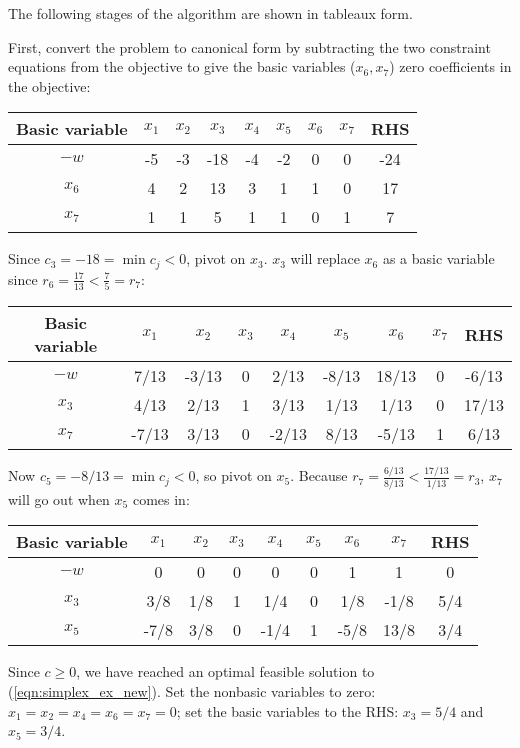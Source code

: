 The following stages of the algorithm are shown in tableaux form.

First, convert the problem to canonical form by subtracting the two constraint equations from the objective to give the basic variables ($x_6,x_7$) zero coefficients in the objective:
\begin{center}
\begin{tabular}{|c|c|c|c|c|c|c|c|c|}
\hline
Basic variable &$x_1$ &$x_2$ &$x_3$ &$x_4$ &$x_5$ &$x_6$ &$x_7$ &RHS \\
\hline
$-w$	&-5	&-3	&-18 &-4 &-2 &0 &0 &-24 \\
$x_6$	&4 &2 &13 &3 &1 &1 &0 &17 \\
$x_7$ &1 &1 &5 &1 &1 &0 &1 &7 \\
\hline
\end{tabular}
\end{center}

Since $c_3 = -18 = \min c_j < 0$, pivot on $x_3$. $x_3$ will replace $x_6$ as a basic variable since $r_6 = \frac{17}{13} < \frac{7}{5} = r_7$:
\begin{center}
\begin{tabular}{|c|c|c|c|c|c|c|c|c|}
\hline
Basic variable &$x_1$ &$x_2$ &$x_3$ &$x_4$ &$x_5$ &$x_6$ &$x_7$ &RHS \\
\hline
$-w$	&7/13 &-3/13 &0 &2/13 &-8/13 &18/13 &0 &-6/13 \\
$x_3$	&4/13 &2/13 &1 &3/13 &1/13 &1/13 &0 &17/13 \\
$x_7$ &-7/13 &3/13 &0 &-2/13 &8/13 &-5/13 &1 &6/13 \\
\hline
\end{tabular}
\end{center}

Now $c_5 = -8/13 = \min c_j < 0$, so pivot on $x_5$. Because $r_7 = \frac{6/13}{8/13} < \frac{17/13}{1/13} = r_3$, $x_7$ will go out when $x_5$ comes in:
\begin{center}
\begin{tabular}{|c|c|c|c|c|c|c|c|c|}
\hline
Basic variable &$x_1$ &$x_2$ &$x_3$ &$x_4$ &$x_5$ &$x_6$ &$x_7$ &RHS \\
\hline
$-w$	&0 &0 &0 &0 &0 &1 &1 &0 \\
$x_3$	&3/8 &1/8 &1 &1/4 &0 &1/8 &-1/8 &5/4 \\
$x_5$ &-7/8 &3/8 &0 &-1/4 &1 &-5/8 &13/8 &3/4 \\
\hline
\end{tabular}
\end{center}

Since $c \geq 0$, we have reached an optimal feasible solution to (\ref{eqn:simplex_ex_new}). Set the nonbasic variables to zero: $x_1 = x_2 = x_4 = x_6 = x_7 = 0$; set the basic variables to the RHS: $x_3 = 5/4$ and $x_5 = 3/4$.

